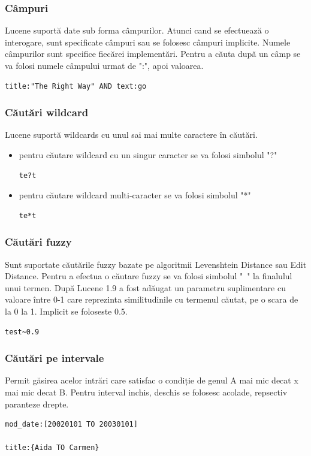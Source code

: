 \documentclass[a4paper, 12pt, twoside]{report}
\begin{document}
	\subsubsection{Câmpuri}
Lucene suportă date sub forma câmpurilor. Atunci cand se efectuează o interogare, sunt specificate câmpuri sau se folosesc câmpuri implicite. Numele câmpurilor sunt specifice fiecărei implementări. Pentru a căuta după un câmp se va folosi numele câmpului urmat de ":", apoi valoarea.
\begin{lstlisting}[caption={exemplu de căutare după câmpuri - Lucene query},captionpos=b]
title:"The Right Way" AND text:go
\end{lstlisting}

 	\subsubsection{Căutări wildcard}
Lucene suportă wildcards cu unul sai mai multe caractere în căutări.
\begin{itemize}
\item pentru căutare wildcard cu un singur caracter se va folosi simbolul "?"
\begin{lstlisting}[caption={căutare wildcard cu un singur caracter - Lucene query},captionpos=b]
te?t
\end{lstlisting}
\item pentru căutare wildcard multi-caracter se va folosi simbolul "*"
\begin{lstlisting}[caption={căutare wildcardmulti-caracter - Lucene query},captionpos=b]
te*t
\end{lstlisting}
\end{itemize}

	\subsubsection{Căutări fuzzy}
Sunt suportate căutările fuzzy bazate pe algoritmii Levenshtein Distance sau Edit Distance. Pentru a efectua o căutare fuzzy se va folosi simbolul "~" la finalulul unui termen. După Lucene 1.9 a fost adăugat un parametru suplimentare cu valoare între 0-1 care reprezinta similitudinile cu termenul căutat, pe o scara de la 0 la 1. Implicit se foloseste 0.5.
\begin{lstlisting}[caption={căutare fuzzy - Lucene query},captionpos=b]
test~0.9
\end{lstlisting}

	\subsubsection{Căutări pe intervale}
Permit găsirea acelor intrări care satisfac o condiție de genul A mai mic decat x mai mic decat B. Pentru interval inchis, deschis se folosesc acolade, repsectiv paranteze drepte.
\begin{lstlisting}[caption={căutari pe intervale - Lucene query},captionpos=b]
mod_date:[20020101 TO 20030101]

title:{Aida TO Carmen}
\end{lstlisting}
\end{document}
